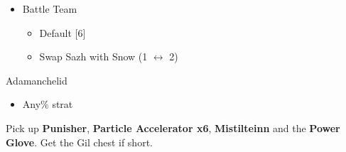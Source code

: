 \begin{menu}
	\begin{itemize}
		\paradigm
		\begin{itemize}
			\item Battle Team
				\begin{itemize}
					\item Default [6]
					\item Swap Sazh with Snow (1 $\leftrightarrow$ 2)
				\end{itemize}
		\end{itemize}
	\end{itemize}
\end{menu}

\begin{battle}{Adamanchelid}
	\begin{itemize}
		\item Any\% strat
	\end{itemize}
\end{battle}

Pick up \textbf{Punisher}, \textbf{Particle Accelerator x6}, \textbf{Mistilteinn} and the \textbf{Power Glove}.
Get the Gil chest if short.

